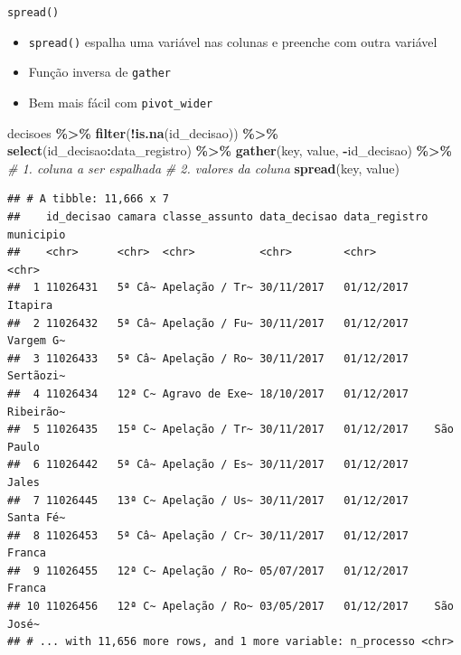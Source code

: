 \documentclass[
  10pt,
  ignorenonframetext,
]{beamer}
\newenvironment{Shaded}{\begin{snugshade}}{\end{snugshade}}
\newcommand{\CommentTok}[1]{\textcolor[rgb]{0.56,0.35,0.01}{\textit{#1}}}
\newcommand{\KeywordTok}[1]{\textcolor[rgb]{0.13,0.29,0.53}{\textbf{#1}}}
\newcommand{\NormalTok}[1]{#1}
\newcommand{\OperatorTok}[1]{\textcolor[rgb]{0.81,0.36,0.00}{\textbf{#1}}}
\newcommand{\StringTok}[1]{\textcolor[rgb]{0.31,0.60,0.02}{#1}}
\begin{document}
\begin{frame}[fragile]{\texttt{spread()}}
\protect\hypertarget{spread}{}
\begin{itemize}
\item
  \texttt{spread()} espalha uma variável nas colunas e preenche com
  outra variável
\item
  Função inversa de \texttt{gather}
\item
  Bem mais fácil com \texttt{pivot\_wider}
\end{itemize}

\begin{Shaded}
\begin{Highlighting}[]
\NormalTok{decisoes }\OperatorTok{\%\textgreater{}\%}\StringTok{ }
\StringTok{  }\KeywordTok{filter}\NormalTok{(}\OperatorTok{!}\KeywordTok{is.na}\NormalTok{(id\_decisao)) }\OperatorTok{\%\textgreater{}\%}\StringTok{ }
\StringTok{  }\KeywordTok{select}\NormalTok{(id\_decisao}\OperatorTok{:}\NormalTok{data\_registro) }\OperatorTok{\%\textgreater{}\%}\StringTok{ }
\StringTok{  }\KeywordTok{gather}\NormalTok{(key, value, }\OperatorTok{{-}}\NormalTok{id\_decisao) }\OperatorTok{\%\textgreater{}\%}\StringTok{ }
\StringTok{  }\CommentTok{\# 1. coluna a ser espalhada}
\StringTok{  }\CommentTok{\# 2. valores da coluna}
\StringTok{  }\KeywordTok{spread}\NormalTok{(key, value)}
\end{Highlighting}
\end{Shaded}

\begin{verbatim}
## # A tibble: 11,666 x 7
##    id_decisao camara classe_assunto data_decisao data_registro municipio
##    <chr>      <chr>  <chr>          <chr>        <chr>         <chr>    
##  1 11026431   5ª Câ~ Apelação / Tr~ 30/11/2017   01/12/2017    Itapira  
##  2 11026432   5ª Câ~ Apelação / Fu~ 30/11/2017   01/12/2017    Vargem G~
##  3 11026433   5ª Câ~ Apelação / Ro~ 30/11/2017   01/12/2017    Sertãozi~
##  4 11026434   12ª C~ Agravo de Exe~ 18/10/2017   01/12/2017    Ribeirão~
##  5 11026435   15ª C~ Apelação / Tr~ 30/11/2017   01/12/2017    São Paulo
##  6 11026442   5ª Câ~ Apelação / Es~ 30/11/2017   01/12/2017    Jales    
##  7 11026445   13ª C~ Apelação / Us~ 30/11/2017   01/12/2017    Santa Fé~
##  8 11026453   5ª Câ~ Apelação / Cr~ 30/11/2017   01/12/2017    Franca   
##  9 11026455   12ª C~ Apelação / Ro~ 05/07/2017   01/12/2017    Franca   
## 10 11026456   12ª C~ Apelação / Ro~ 03/05/2017   01/12/2017    São José~
## # ... with 11,656 more rows, and 1 more variable: n_processo <chr>
\end{verbatim}
\end{frame}
\end{document}
